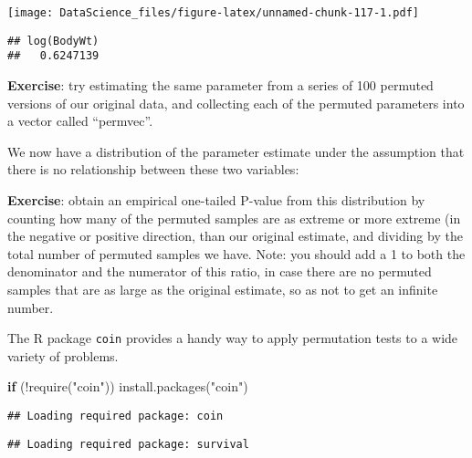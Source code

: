 \documentclass[
]{book}
\newenvironment{Shaded}{\begin{snugshade}}{\end{snugshade}}
\newcommand{\AttributeTok}[1]{\textcolor[rgb]{0.77,0.63,0.00}{#1}}
\newcommand{\ControlFlowTok}[1]{\textcolor[rgb]{0.13,0.29,0.53}{\textbf{#1}}}
\newcommand{\DecValTok}[1]{\textcolor[rgb]{0.00,0.00,0.81}{#1}}
\newcommand{\FunctionTok}[1]{\textcolor[rgb]{0.00,0.00,0.00}{#1}}
\newcommand{\NormalTok}[1]{#1}
\newcommand{\OtherTok}[1]{\textcolor[rgb]{0.56,0.35,0.01}{#1}}
\newcommand{\SpecialCharTok}[1]{\textcolor[rgb]{0.00,0.00,0.00}{#1}}
\newcommand{\StringTok}[1]{\textcolor[rgb]{0.31,0.60,0.02}{#1}}
\begin{document}
\texttt{[image: DataScience\_files/figure-latex/unnamed-chunk-117-1.pdf]}

\begin{Shaded}
\end{Shaded}

\begin{verbatim}
## log(BodyWt) 
##   0.6247139
\end{verbatim}

\textbf{Exercise}: try estimating the same parameter from a series of 100 permuted versions of our original data, and collecting each of the permuted parameters into a vector called ``permvec''.

We now have a distribution of the parameter estimate under the assumption that there is no relationship between these two variables:

\textbf{Exercise}: obtain an empirical one-tailed P-value from this distribution by counting how many of the permuted samples are as extreme or more extreme (in the negative or positive direction, than our original estimate, and dividing by the total number of permuted samples we have. Note: you should add a 1 to both the denominator and the numerator of this ratio, in case there are no permuted samples that are as large as the original estimate, so as not to get an infinite number.

The R package \texttt{coin} provides a handy way to apply permutation tests to a wide variety of problems.

\begin{Shaded}
\begin{Highlighting}[]
\ControlFlowTok{if}\NormalTok{ (}\SpecialCharTok{!}\FunctionTok{require}\NormalTok{(}\StringTok{"coin"}\NormalTok{)) }\FunctionTok{install.packages}\NormalTok{(}\StringTok{"coin"}\NormalTok{)}
\end{Highlighting}
\end{Shaded}

\begin{verbatim}
## Loading required package: coin
\end{verbatim}

\begin{verbatim}
## Loading required package: survival
\end{verbatim}
\end{document}
